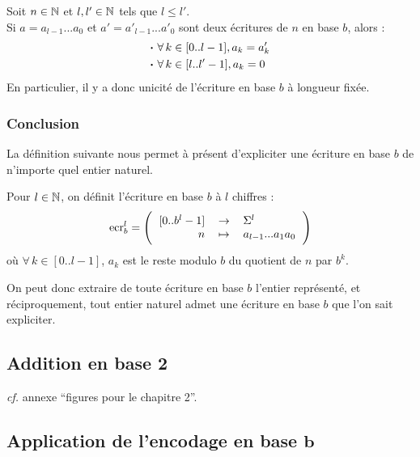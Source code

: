 			\begin{Corollaire}
				Soit \(n\in\mathbb{N}\) et \(l,l'\in\mathbb{N}\) tels que \(l\leq l'\). \\
				Si \(a = a_{l-1}...a_0\) et \(a' = a'_{l-1}...a'_0\) sont deux écritures de \(n\) en base \(b\), alors :
					\begin{align*}
						& \text{\(\bm{\cdot}\) } \forall\,k\in[0..l-1], a_k = a'_k \\
						& \text{\(\bm{\cdot}\) } \forall\,k\in[l..l'-1], a_k = 0
					\end{align*}
				En particulier, il y a donc unicité de l'écriture en base \(b\) à longueur fixée.
			\end{Corollaire}
		
		\subsubsection{Conclusion}
			
			La définition suivante nous permet à présent d'expliciter une écriture en base \(b\) de n'importe quel entier naturel.
			
			\eqskip{3mm}
			\begin{Definition}
				Pour \(l\in\mathbb{N}\), on définit l'écriture en base \(b\) à \(l\) chiffres :
					\[
						\ecr_b^l = \fun{[0..b^l-1]}{\Sigma^l}{n}{a_{l-1}...a_1a_0}
					\]
					où \(\forall\,k\in[0..l-1]\), \(a_k\) est le reste modulo \(b\) du quotient de \(n\) par \(b^k\).
			\end{Definition}
		
			On peut donc extraire de toute écriture en base \(b\) l'entier représenté, et réciproquement, tout entier naturel admet une écriture en base \(b\) que l'on sait expliciter.
		
	\subsection{Addition en base 2}
	
		\emph{cf.} annexe ``figures pour le chapitre 2''.
	
	\subsection{Application de l'encodage en base \(\bm{b}\)}
		
		
